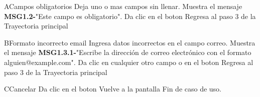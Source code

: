 \begin{UCtrayectoriaA}{A}{Campos obligatorios}
	\UCpaso[\UCactor] Deja uno o mas campos sin llenar.
	\UCpaso Muestra el mensaje {\bf MSG1.2-}"Este campo es obligatorio".
	\UCpaso[\UCactor] Da clic en el boton 
	\UCpaso Regresa al paso 3 de la Trayectoria principal
\end{UCtrayectoriaA}

\begin{UCtrayectoriaA}{B}{Formato incorrecto email}
	\UCpaso[\UCactor] Ingresa datos incorrectos en el campo correo.
	\UCpaso Muestra el mensaje {\bf MSG1.3.1-}"Escribe la dirección de correo electrónico con el formato alguien@example.com".
	\UCpaso[\UCactor] Da clic en cualquier otro campo o en el boton 
	\UCpaso Regresa al paso 3 de la Trayectoria principal
\end{UCtrayectoriaA}

\begin{UCtrayectoriaA}{C}{Cancelar}
	\UCpaso[\UCactor] Da clic en el boton 
	\UCpaso Vuelve a la pantalla 
	\UCpaso Fin de caso de uso.
\end{UCtrayectoriaA}

